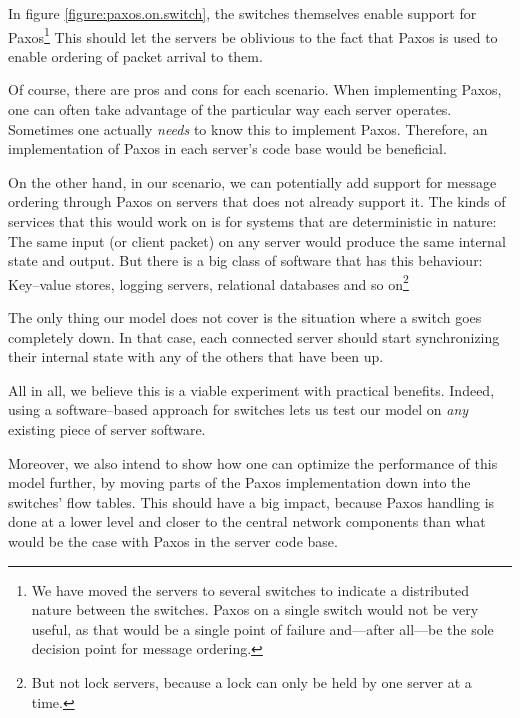 In figure \ref{figure:paxos.on.switch}, the switches themselves enable
support for Paxos\footnote{We have moved the servers to several switches
to indicate a distributed nature between the switches.
Paxos on a single switch would not be very useful, as that would be a single
point of failure and---after all---be the sole decision point for message
ordering.}
This should let the servers be oblivious to the fact that Paxos is used to
enable ordering of packet arrival to them.

Of course, there are pros and cons for each scenario.
When implementing Paxos, one can often take advantage of
the particular way each server operates. Sometimes one actually
\textit{needs} to know this to implement Paxos.  Therefore, an
implementation of Paxos in each server's code base would be beneficial.

On the other hand, in our scenario, we can potentially add support for
message ordering through Paxos on servers that does not already support it.
The kinds of services that this would work on is for systems that are
deterministic in nature: The same input (or client packet) on any server
would produce the same internal state and output.
%
But there is a big class of software that has this behaviour:  Key--value
stores, logging servers, relational databases and so on\footnote{But not
lock servers, because a lock can only be held by one server at a time.}

The only thing our model does not cover is the situation where a switch goes
completely down.  In that case, each connected server should start
synchronizing their internal state with any of the others that have been up.

All in all, we believe this is a viable experiment with practical benefits.
Indeed, using a software--based approach for switches lets us test our model
on \textit{any} existing piece of server software.

Moreover, we also intend to show how one can optimize the performance of
this model further, by moving parts of the Paxos implementation down into
the switches' flow tables.  This should have a big impact, because Paxos
handling is done at a lower level and closer to the central network
components than what would be the case with Paxos in the server code base.

